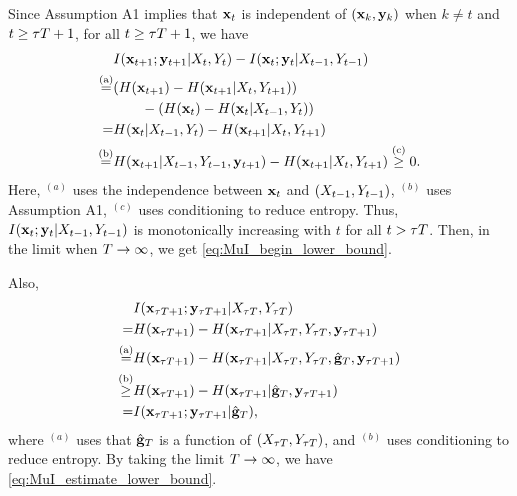\documentclass[12pt, draftclsnofoot,journal,onecolumn]{IEEEtran}
\begin{document}
Since Assumption A1 implies that ${\mathbf{x}}_t$ is independent of $({\mathbf{x}}_k,{\mathbf{y}}_k)$ when $k\neq t$ and $t\geq {\tau T}+1$, for all $t\geq {\tau T}+1$, we have
\begin{align*}
    &I({\mathbf{x}}_{t+1};{\mathbf{y}}_{t+1}|X_{t},Y_{t}) - I({\mathbf{x}}_{t};{\mathbf{y}}_{t}|X_{t-1},Y_{t-1})\\
    \stackrel{\rm{( a)}}{=}&(H({\mathbf{x}}_{t+1}) - H({\mathbf{x}}_{t+1}|X_t,Y_{t+1})) \\
    &\qquad - (H({\mathbf{x}}_{t}) - H({\mathbf{x}}_{t}|X_{t-1},Y_{t}))\\
    =&H({\mathbf{x}}_{t}|X_{t-1},Y_{t}) - H({\mathbf{x}}_{t+1}|X_t,Y_{t+1})\\
    \stackrel{\rm{( b)}}{=}&H({\mathbf{x}}_{t+1}|X_{t-1},Y_{t-1},{\mathbf{y}}_{t+1}) - H({\mathbf{x}}_{t+1}|X_t,Y_{t+1})
    \stackrel{\rm{( c)}}{\geq} 0.
\end{align*}
Here, $^{(a)}$ uses the independence between ${\mathbf{x}}_t$ and $(X_{t-1},Y_{t-1})$, $^{(b)}$ uses Assumption A1, $^{(c)}$ uses conditioning to reduce entropy. Thus, $I({\mathbf{x}}_t;{\mathbf{y}}_t|X_{t-1},Y_{t-1})$ is monotonically increasing with $t$ for all $t>{\tau T}$. 
Then, in the limit when $T\to\infty$, we get  \eqref{eq:MuI_begin_lower_bound}. 

 
Also, 
 \begin{align*}
     &I({\mathbf{x}}_{{\tau T}+1};{\mathbf{y}}_{{\tau T}+1}|X_{{\tau T}},Y_{{\tau T}})\\
     =&H({\mathbf{x}}_{{\tau T}+1})-H({\mathbf{x}}_{{\tau T}+1}|X_{{\tau T}},Y_{{\tau T}},{\mathbf{y}}_{{\tau T}+1})\\
     \stackrel{\rm{( a)}}{=}&H({\mathbf{x}}_{{\tau T}+1})-H({\mathbf{x}}_{{\tau T}+1}|X_{{\tau T}},Y_{{\tau T}},\hat{{\mathbf{g}}}_{T},{\mathbf{y}}_{{\tau T}+1})\\
     \stackrel{\rm{( b)}}{\geq}&H({\mathbf{x}}_{{\tau T}+1})-H({\mathbf{x}}_{{\tau T}+1}|\hat{{\mathbf{g}}}_{T},{\mathbf{y}}_{{\tau T}+1})\\
     =&I({\mathbf{x}}_{{\tau T}+1};{\mathbf{y}}_{{\tau T}+1}|\hat{{\mathbf{g}}}_{T}),
 \end{align*}
 where $^{(a)}$ uses that $\hat{{\mathbf{g}}}_{T}$ is a function of $(X_{{\tau T}},Y_{{\tau T}})$, and $^{(b)}$ uses conditioning to reduce entropy. By taking the limit $T\to \infty$, we have \eqref{eq:MuI_estimate_lower_bound}.
\end{document}
